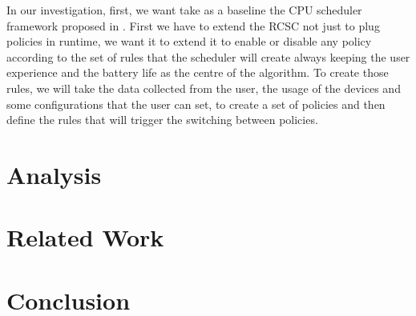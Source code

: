 \documentclass[conference]{IEEEtran}
\begin{document}
In our investigation, first, we want take as a baseline the CPU scheduler framework proposed in \cite{ALMA01}. First we have to extend the RCSC not just to plug policies in runtime, we want it to extend it to enable or disable any policy according to the set of rules that the scheduler will create always keeping the user experience and the battery life as the centre of the algorithm. To create those rules, we will take the data collected from the user, the usage of the devices and some configurations that the user can set, to create a set of policies and then define the rules that will trigger the switching between policies.

\section{Analysis}

\section{Related Work}

\section{Conclusion}


\nocite{*}


\end{document}
